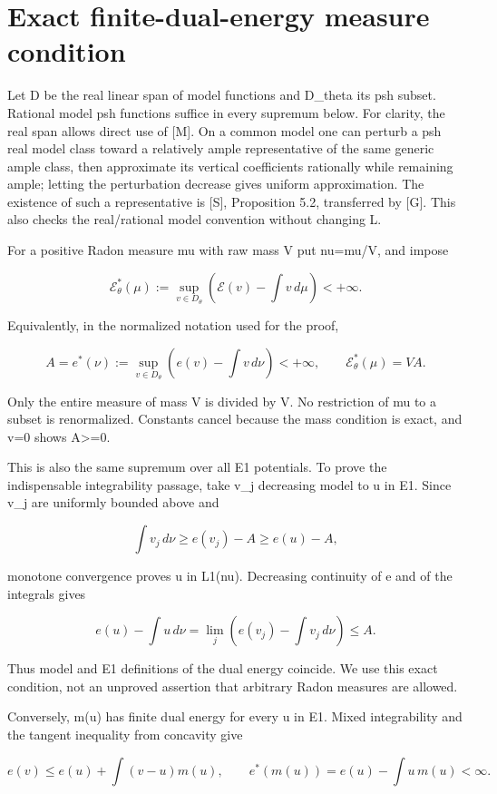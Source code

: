 \documentclass[11pt]{article}
\begin{document}
\section{Exact finite-dual-energy measure condition}

Let D be the real linear span of model functions and D\_theta its psh subset. Rational model psh functions suffice in every supremum below. For clarity, the real span allows direct use of [M]. On a common model one can perturb a psh real model class toward a relatively ample representative of the same generic ample class, then approximate its vertical coefficients rationally while remaining ample; letting the perturbation decrease gives uniform approximation. The existence of such a representative is [S], Proposition 5.2, transferred by [G]. This also checks the real/rational model convention without changing L.

For a positive Radon measure mu with raw mass V put nu=mu/V, and impose

\[
\mathcal E^*_\theta(\mu):=
\sup_{v\in D_\theta}\left(\mathcal E(v)-\int v\,d\mu\right)<+\infty.
\]

Equivalently, in the normalized notation used for the proof,

\[
A=e^*(\nu):=\sup_{v\in D_\theta}\left(e(v)-\int v\,d\nu\right)<+\infty,
\qquad\mathcal E^*_\theta(\mu)=VA.
\]

Only the entire measure of mass V is divided by V. No restriction of mu to a subset is renormalized. Constants cancel because the mass condition is exact, and v=0 shows A\textgreater{}=0.

This is also the same supremum over all E1 potentials. To prove the indispensable integrability passage, take v\_j decreasing model to u in E1. Since v\_j are uniformly bounded above and

\[
\int v_j\,d\nu\geq e(v_j)-A\geq e(u)-A,
\]

monotone convergence proves u in L1(nu). Decreasing continuity of e and of the integrals gives

\[
e(u)-\int u\,d\nu=\lim_j\left(e(v_j)-\int v_j\,d\nu\right)\leq A.
\]

Thus model and E1 definitions of the dual energy coincide. We use this exact condition, not an unproved assertion that arbitrary Radon measures are allowed.

Conversely, m(u) has finite dual energy for every u in E1. Mixed integrability and the tangent inequality from concavity give

\[
e(v)\leq e(u)+\int(v-u)m(u),\qquad
e^*(m(u))=e(u)-\int u\,m(u)<\infty.
\]
\end{document}
